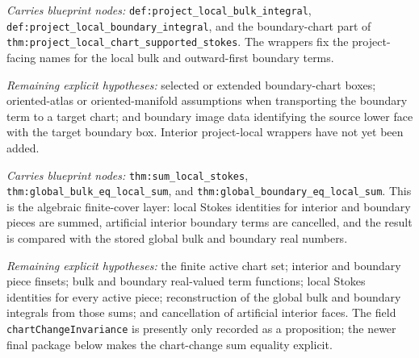 \begin{definition}
  \label{anc:project_local_integral_wrappers}
  \leanok
  \emph{Carries blueprint nodes:}
  \texttt{def:project\_local\_bulk\_integral},
  \texttt{def:project\_local\_boundary\_integral}, and the boundary-chart part
  of \texttt{thm:project\_local\_chart\_supported\_stokes}.  The wrappers fix
  the project-facing names for the local bulk and outward-first boundary terms.

  \emph{Remaining explicit hypotheses:}
  selected or extended boundary-chart boxes; oriented-atlas or oriented-manifold
  assumptions when transporting the boundary term to a target chart; and
  boundary image data identifying the source lower face with the target
  boundary box.  Interior project-local wrappers have not yet been added.
\end{definition}

\begin{definition}
  \label{anc:global_stokes_assembly_data}
  \leanok
  \emph{Carries blueprint nodes:}
  \texttt{thm:sum\_local\_stokes},
  \texttt{thm:global\_bulk\_eq\_local\_sum}, and
  \texttt{thm:global\_boundary\_eq\_local\_sum}.  This is the algebraic
  finite-cover layer: local Stokes identities for interior and boundary pieces
  are summed, artificial interior boundary terms are cancelled, and the result
  is compared with the stored global bulk and boundary real numbers.

  \emph{Remaining explicit hypotheses:}
  the finite active chart set; interior and boundary piece finsets; bulk and
  boundary real-valued term functions; local Stokes identities for every active
  piece; reconstruction of the global bulk and boundary integrals from those
  sums; and cancellation of artificial interior faces.  The field
  \texttt{chartChangeInvariance} is presently only recorded as a proposition;
  the newer final package below makes the chart-change sum equality explicit.
\end{definition}

